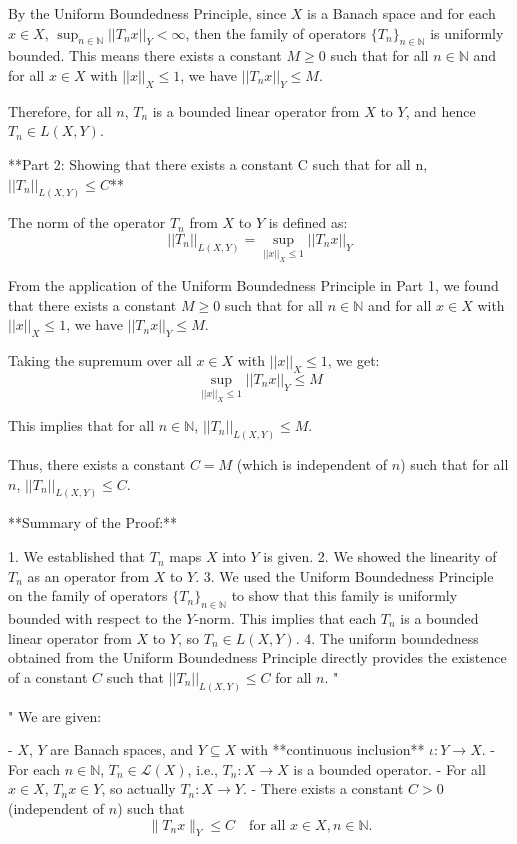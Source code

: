     By the Uniform Boundedness Principle, since $X$ is a Banach space and for each $x \in X$, $\sup_{n \in \mathbb{N}} ||T_n x||_Y < \infty$, then the family of operators $\{T_n\}_{n \in \mathbb{N}}$ is uniformly bounded. This means there exists a constant $M \ge 0$ such that for all $n \in \mathbb{N}$ and for all $x \in X$ with $||x||_X \le 1$, we have $||T_n x||_Y \le M$.

    Therefore, for all $n$, $T_n$ is a bounded linear operator from $X$ to $Y$, and hence $T_n \in L(X, Y)$.

**Part 2: Showing that there exists a constant C such that for all n, $||T_n||_{L(X,Y)} \le C$**

The norm of the operator $T_n$ from $X$ to $Y$ is defined as:
$$||T_n||_{L(X,Y)} = \sup_{||x||_X \le 1} ||T_n x||_Y$$

From the application of the Uniform Boundedness Principle in Part 1, we found that there exists a constant $M \ge 0$ such that for all $n \in \mathbb{N}$ and for all $x \in X$ with $||x||_X \le 1$, we have $||T_n x||_Y \le M$.

Taking the supremum over all $x \in X$ with $||x||_X \le 1$, we get:
$$\sup_{||x||_X \le 1} ||T_n x||_Y \le M$$

This implies that for all $n \in \mathbb{N}$, $||T_n||_{L(X,Y)} \le M$.

Thus, there exists a constant $C = M$ (which is independent of $n$) such that for all $n$, $||T_n||_{L(X,Y)} \le C$.

**Summary of the Proof:**

1.  We established that $T_n$ maps $X$ into $Y$ is given.
2.  We showed the linearity of $T_n$ as an operator from $X$ to $Y$.
3.  We used the Uniform Boundedness Principle on the family of operators $\{T_n\}_{n \in \mathbb{N}}$ to show that this family is uniformly bounded with respect to the $Y$-norm. This implies that each $T_n$ is a bounded linear operator from $X$ to $Y$, so $T_n \in L(X, Y)$.
4.  The uniform boundedness obtained from the Uniform Boundedness Principle directly provides the existence of a constant $C$ such that $||T_n||_{L(X,Y)} \le C$ for all $n$.
"

"
We are given:

- \( X \), \( Y \) are Banach spaces, and \( Y \subseteq X \) with **continuous inclusion** \( \iota: Y \to X \).
- For each \( n \in \mathbb{N} \), \( T_n \in \mathcal{L}(X) \), i.e., \( T_n: X \to X \) is a bounded operator.
- For all \( x \in X \), \( T_n x \in Y \), so actually \( T_n: X \to Y \).
- There exists a constant \( C > 0 \) (independent of \( n \)) such that
  \[
  \|T_n x\|_Y \leq C \quad \text{for all } x \in X, n \in \mathbb{N}.
  \]

